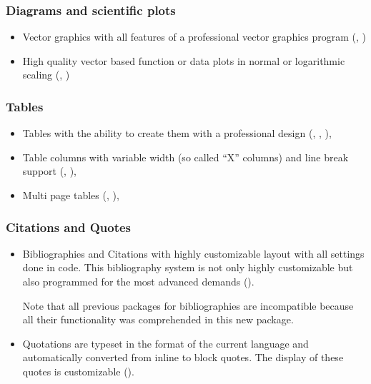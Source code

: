 \subsubsection*{Diagrams and scientific plots}
\begin{itemize}
\item Vector graphics with all features of a professional vector graphics program (, )
%
\item High quality vector based function or data plots in normal or logarithmic scaling (, )
\end{itemize}

\subsubsection*{Tables}
\begin{itemize}
\item Tables with the ability to create them with a professional design (, , ),
%
\item Table columns with variable width (so called \enquote{X} columns) and line break support (, ),
%
\item Multi page tables (, ),
\end{itemize}

\subsubsection*{Citations and Quotes}
\begin{itemize}
\item Bibliographies and Citations with highly customizable layout with all settings done in \latex code. This bibliography system is not only highly customizable but also programmed for the most advanced demands (). 
 
Note that all previous packages for bibliographies are incompatible because all their functionality was comprehended in this new package. 
%
\item Quotations are typeset in the format of the current language and automatically converted from inline to block quotes. The display of these quotes is customizable ().  
\end{itemize}

